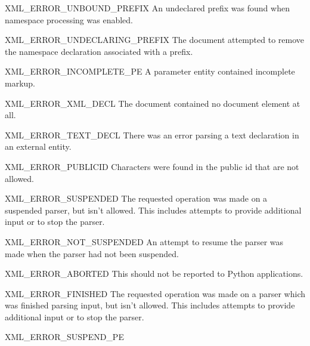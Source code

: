 \begin{datadescni}{XML_ERROR_UNBOUND_PREFIX}
An undeclared prefix was found when namespace processing was enabled.
\end{datadescni}

\begin{datadescni}{XML_ERROR_UNDECLARING_PREFIX}
The document attempted to remove the namespace declaration associated
with a prefix.
\end{datadescni}

\begin{datadescni}{XML_ERROR_INCOMPLETE_PE}
A parameter entity contained incomplete markup.
\end{datadescni}

\begin{datadescni}{XML_ERROR_XML_DECL}
The document contained no document element at all.
\end{datadescni}

\begin{datadescni}{XML_ERROR_TEXT_DECL}
There was an error parsing a text declaration in an external entity.
\end{datadescni}

\begin{datadescni}{XML_ERROR_PUBLICID}
Characters were found in the public id that are not allowed.
\end{datadescni}

\begin{datadescni}{XML_ERROR_SUSPENDED}
The requested operation was made on a suspended parser, but isn't
allowed.  This includes attempts to provide additional input or to
stop the parser.
\end{datadescni}

\begin{datadescni}{XML_ERROR_NOT_SUSPENDED}
An attempt to resume the parser was made when the parser had not been
suspended.
\end{datadescni}

\begin{datadescni}{XML_ERROR_ABORTED}
This should not be reported to Python applications.
\end{datadescni}

\begin{datadescni}{XML_ERROR_FINISHED}
The requested operation was made on a parser which was finished
parsing input, but isn't allowed.  This includes attempts to provide
additional input or to stop the parser.
\end{datadescni}

\begin{datadescni}{XML_ERROR_SUSPEND_PE}
\end{datadescni}
